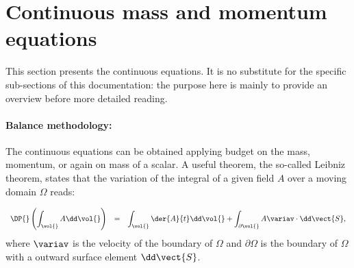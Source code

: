 
%
%
%
%


\section{Continuous mass and momentum equations}

This section presents the continuous equations. It is no substitute for the
specific sub-sections of this documentation: the purpose here is mainly to
provide an overview before more detailed reading.

\paragraph{Balance methodology:}
The continuous equations can be obtained applying budget on the mass,
momentum, or again on mass of a scalar. A useful theorem, the so-called
Leibniz theorem, states that the variation of the integral of a given field $A$
over a moving domain $\Omega$ reads:

 \begin{equation}\label{eq:goveqn:leibnitz_th}
\begin{array}{r c l}
\displaystyle \DP{} \left( \int_{\vol{} } A \dd \vol{} \right) &=&
\displaystyle \int_{\vol{} }\der{A}{t} \dd \vol{} + \int_{\partial \vol{}} A  \variav \cdot  \dd \vect{S},
\end{array}
 \end{equation}
 where $\variav$ is the velocity of the boundary of $\Omega$ and $\partial \Omega$ is the boundary of $\Omega$ with a outward surface element $\dd \vect{S}$.

